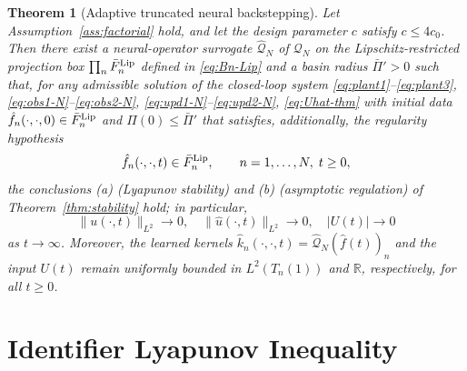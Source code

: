 \documentclass[journal,twoside,web]{ieeecolor}
\newtheorem{theorem}{Theorem}
\begin{document}
\begin{theorem}[Adaptive truncated neural backstepping]\label{thm:neural}
Let Assumption~\ref{ass:factorial} hold, and let the design parameter $c$ satisfy $c\le 4c_0$. Then there exist a neural-operator surrogate $\widehat{\mathcal Q}_N$ of $\mathcal Q_N$ on the Lipschitz-restricted projection box $\prod_n \bar F_n^{\rm Lip}$ defined in \eqref{eq:Bn-Lip} and a basin radius $\bar\Pi'>0$ such that, for any admissible solution of the closed-loop system \eqref{eq:plant1}--\eqref{eq:plant3}, \eqref{eq:obs1-N}--\eqref{eq:obs2-N}, \eqref{eq:upd1-N}--\eqref{eq:upd2-N}, \eqref{eq:Uhat-thm} with initial data $\hat f_n(\cdot,\cdot,0)\in \bar F_n^{\rm Lip}$ and $\Pi(0)\le\bar\Pi'$ that satisfies, additionally, the regularity hypothesis
\begin{equation}\label{eq:Lip-traj-hyp}
\hat f_n(\cdot,\cdot,t)\in \bar F_n^{\rm Lip},\qquad n=1,\ldots,N,\;t\ge 0,
\end{equation}
the conclusions \emph{(a)} (Lyapunov stability) and \emph{(b)} (asymptotic regulation) of Theorem~\ref{thm:stability} hold; in particular,
\begin{equation}\label{eq:thm-neural-reg}
\|u(\cdot,t)\|_{L^2}\to 0,\quad \|\hat u(\cdot,t)\|_{L^2}\to 0,\quad |U(t)|\to 0
\end{equation}
as $t\to\infty$. Moreover, the learned kernels $\hat k_n(\cdot,\cdot,t)=\widehat{\mathcal Q}_N(\hat f(t))_n$ and the input $U(t)$ remain uniformly bounded in $L^2(T_n(1))$ and $\mathbb R$, respectively, for all $t\ge 0$. 
\end{theorem}

\section{Identifier Lyapunov Inequality}\label{sec:proof-identifier}
\end{document}

